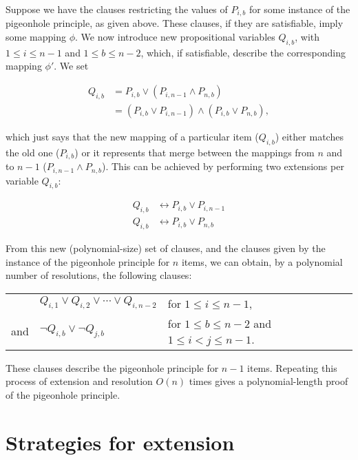 \documentclass[11pt]{article}
\begin{document}
Suppose we have the clauses restricting the values of $P_{i,b}$ for some instance of the pigeonhole principle, as given above. These clauses, if they are satisfiable, imply some mapping $\phi$. We now introduce new propositional variables $Q_{i,b}$, with $1 \leq i \leq n-1$ and $1 \leq b \leq n-2$, which, if satisfiable, describe the corresponding mapping $\phi'$. We set

\begin{equation*}
  \begin{align*}
    Q_{i,b} &= P_{i,b} \vee (P_{i,n-1} \wedge P_{n,b}) \\
      &= (P_{i,b} \vee P_{i,n-1}) \wedge (P_{i,b} \vee P_{n,b}),
  \end{align*}
\end{equation*}

which just says that the new mapping of a particular item ($Q_{i,b}$) either matches the old one ($P_{i,b}$) or it represents that merge between the mappings from $n$ and to $n-1$ ($P_{i,n-1} \wedge P_{n,b}$). This can be achieved by performing two extensions per variable $Q_{i,b}$:

\begin{equation*}
  \begin{align*}
    Q_{i,b} &\leftrightarrow P_{i,b} \vee P_{i,n-1} \\
    Q_{i,b} &\leftrightarrow P_{i,b} \vee P_{n,b}
  \end{align*}
\end{equation*}

From this new (polynomial-size) set of clauses, and the clauses given by the instance of the pigeonhole principle for $n$ items, we can obtain, by a polynomial number of resolutions, the following clauses:

\begin{table}[h]
  \begin{tabular}{rll}
        & $Q_{i,1} \vee Q_{i,2} \vee \cdots \vee Q_{i,n-2}$ & for $1 \leq i \leq n-1$, \\
    and & $\neg Q_{i,b} \vee \neg Q_{j,b}$ & for $1 \leq b \leq n-2$ and $1 \leq i < j \leq n-1$.
  \end{tabular}
\end{table}
\FloatBarrier

These clauses describe the pigeonhole principle for $n-1$ items. Repeating this process of extension and resolution $O(n)$ times gives a polynomial-length proof of the pigeonhole principle.

\section{Strategies for extension}
\end{document}
